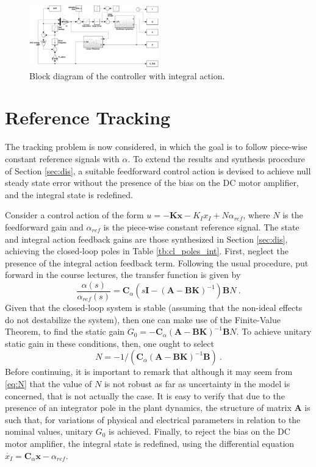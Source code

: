 \documentclass[letterpaper, 10 pt, conference]{ieeeconf}
\begin{document}
\begin{figure}[h]
    \centering
    \includegraphics[width = 0.5\textwidth]{figures/block_diag.png}
    \caption{Block diagram of the controller with integral action.}
    \label{fig:blk_diag}
\end{figure}

\section{Reference Tracking}\label{sec:trck}

The tracking problem is now considered, in which the goal is to follow piece-wise constant reference signals with $\alpha$. To extend the results and synthesis procedure of Section \ref{sec:dis}, a suitable feedforward control action is devised to achieve null steady state error without the presence of the bias on the DC motor amplifier, and the integral state is redefined. 

Consider a control action of the form  $u = -\mathbf{Kx}-K_Ix_I+N\alpha_{ref}$, where $N$ is the feedforward gain and $\alpha_{ref}$ is the piece-wise constant reference signal. The state and integral action feedback gains are those synthesized in Section \ref{sec:dis}, achieving the closed-loop poles in Table \ref{tb:cl_poles_int}. First, neglect the presence of the integral action feedback term. Following the usual procedure, put forward in the course lectures, the transfer function is given by
\begin{equation*}
    \frac{\alpha(s)}{\alpha_{ref}(s)} = \mathbf{C}_{\alpha}(s\mathbf{I}-(\mathbf{A}-\mathbf{BK})^{-1})\mathbf{B}N\:.
\end{equation*}
Given that the closed-loop system is stable (assuming that the non-ideal effects do not destabilize the system), then one can make use of the Finite-Value Theorem, to find the static gain $G_0 =- \mathbf{C}_{\alpha}(\mathbf{A}-\mathbf{BK})^{-1}\mathbf{B}N$. To achieve unitary static gain in these conditions, then, one ought to select 
\begin{equation}\label{eq:N}
    N = -1/(\mathbf{C}_{\alpha}(\mathbf{A}-\mathbf{BK})^{-1}\mathbf{B})\:.
\end{equation}
Before continuing, it is important to remark that although it may seem from \eqref{eq:N} that the value of $N$ is not robust as far as uncertainty in the model is concerned, that is not actually the case. It is easy to verify that due to the presence of an integrator pole in the plant dynamics, the structure of matrix $\mathbf{A}$ is such that, for variations of physical and electrical parameters in relation to the nominal values, unitary $G_0$ is achieved. Finally, to reject the bias on the DC motor amplifier, the integral state is redefined, using the differential equation $\dot{x_I} = \mathbf{C}_{\alpha}\mathbf{x}-\alpha_{ref}$. 
\end{document}
